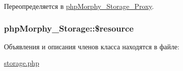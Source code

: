 Переопределяется в \hyperlink{classphpMorphy__Storage__Proxy_a3de6f1b735d4731e491e9e17b88a1f76}{phpMorphy\_\-Storage\_\-Proxy}.

\hypertarget{classphpMorphy__Storage_a7d9a3686870f1902da55b3b68891ada1}{
\subsubsection[{\$resource}]{\setlength{\rightskip}{0pt plus 5cm}phpMorphy\_\-Storage::\$resource}}
\label{classphpMorphy__Storage_a7d9a3686870f1902da55b3b68891ada1}


Объявления и описания членов класса находятся в файле:\begin{DoxyCompactItemize}
\item 
\hyperlink{storage_8php}{storage.php}\end{DoxyCompactItemize}
